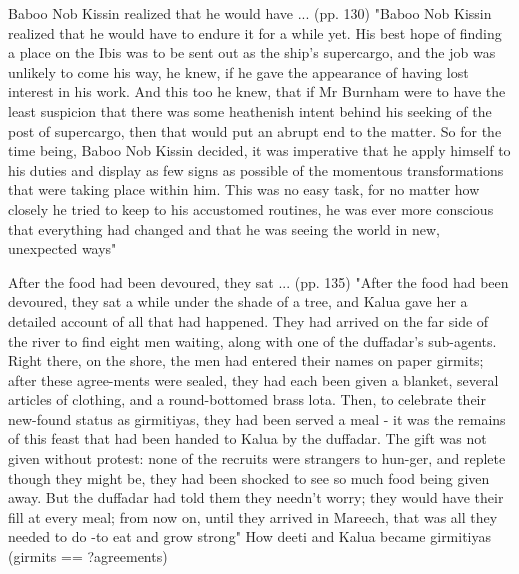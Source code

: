 Baboo Nob Kissin realized that he would have ... (pp. 130)
"Baboo Nob Kissin realized that he would have to endure it for a while yet. His best hope of finding a place on the Ibis was to be sent out as the ship’s supercargo, and the job was unlikely to come his way, he knew, if he gave the appearance of having lost interest in his work. And this too he knew, that if Mr Burnham were to have the least suspicion that there was some heathenish intent behind his seeking of the post of supercargo, then that would put an abrupt end to the matter. So for the time being, Baboo Nob Kissin decided, it was imperative that he apply himself to his duties and display as few signs as possible of the momentous transformations that were taking place within him. This was no easy task, for no matter how closely he tried to keep to his accustomed routines, he was ever more conscious that everything had changed and that he was seeing the world in new, unexpected ways"

After the food had been devoured, they sat ... (pp. 135)
"After the food had been devoured, they sat a while under the shade of a tree, and Kalua gave her a detailed account of all that had happened. They had arrived on the far side of the river to find eight men waiting, along with one of the duffadar’s sub-agents. Right there, on the shore, the men had entered their names on paper girmits; after these agree-ments were sealed, they had each been given a blanket, several articles of clothing, and a round-bottomed brass lota. Then, to celebrate their new-found status as girmitiyas, they had been served a meal - it was the remains of this feast that had been handed to Kalua by the duffadar. The gift was not given without protest: none of the recruits were strangers to hun-ger, and replete though they might be, they had been shocked to see so much food being given away. But the duffadar had told them they needn’t worry; they would have their fill at every meal; from now on, until they arrived in Mareech, that was all they needed to do -to eat and grow strong"
How deeti and Kalua became girmitiyas (girmits == ?agreements)

